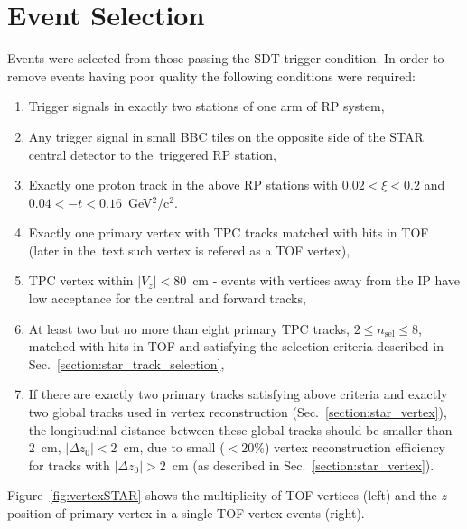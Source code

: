 \section{Event Selection}\label{section:star_event_selection}
Events were selected from those passing the SDT trigger condition. In order to remove events having poor quality the following conditions were required:
\begin{enumerate}
	\item Trigger signals in exactly two stations of one arm of \ac{RP} system,
	\item Any trigger signal in small BBC tiles on the opposite side of the STAR central detector to the~triggered RP station,
	\item Exactly one proton track in the above RP stations with $0.02 < \xi < 0.2$ and $0.04 < -t < 0.16$~GeV$^{2}$/c$^{2}$. 
	\item Exactly one primary vertex with TPC tracks matched with hits in TOF (later in the~text such vertex  is refered as a TOF vertex),
	\item TPC vertex  within $|V_z|<80$~cm - events with vertices away from the IP have low acceptance for the central and forward tracks,
	\item At least two but no more than eight primary TPC tracks, $2\leq n_{\textrm{sel}}\leq 8$, matched with hits in TOF and satisfying the selection criteria described in Sec.~\ref{section:star_track_selection},
	\item If there are exactly two primary tracks satisfying above criteria and exactly two global tracks used in vertex reconstruction (Sec.~\ref{section:star_vertex}), the longitudinal distance between these global tracks should be smaller than $2$~cm, $|\Delta z_0|<2$~cm, due to small ($<20\%$) vertex reconstruction efficiency for tracks with $|\Delta z_0|>2$~cm (as described in Sec.~\ref{section:star_vertex}).
\end{enumerate}
Figure~\ref{fig:vertexSTAR} shows the multiplicity of TOF vertices (left) and the $z$-position of primary vertex in a single TOF vertex events (right). 
